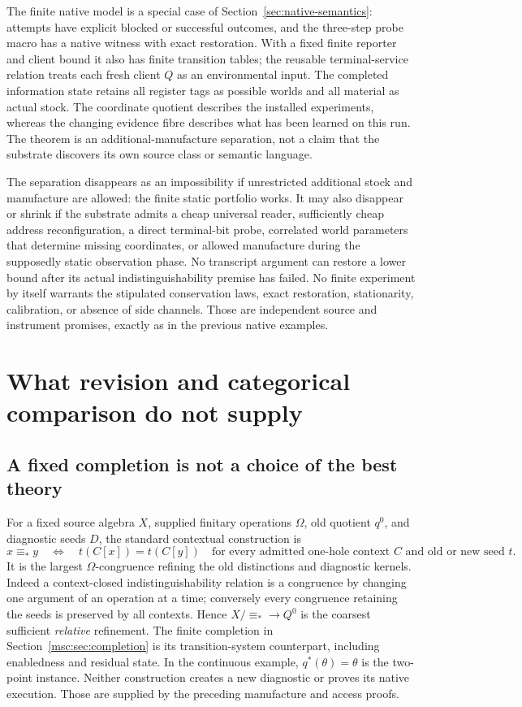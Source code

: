 \documentclass[11pt]{article}
\theoremstyle{definition}
\theoremstyle{remark}
\begin{document}
The finite native model is a special case of Section~\ref{sec:native-semantics}:
attempts have explicit blocked or successful outcomes, and the three-step
probe macro has a native witness with exact restoration. With a fixed
finite reporter and client bound it also has finite transition tables;
the reusable terminal-service relation treats each fresh client $Q$ as
an environmental input. The completed information state retains all
register tags as possible worlds and all material as actual stock.
The coordinate quotient describes the installed experiments, whereas
the changing evidence fibre describes what has been learned on this run.
The theorem is an additional-manufacture separation, not a claim that
the substrate discovers its own source class or semantic language.

The separation disappears as an impossibility if unrestricted additional
stock and manufacture are allowed: the finite static portfolio works.
It may also disappear or shrink if the substrate admits a cheap universal
reader, sufficiently cheap address reconfiguration, a direct terminal-bit
probe, correlated world parameters that determine missing coordinates,
or allowed manufacture during the supposedly static observation phase.
No transcript argument can restore a lower bound after its actual
indistinguishability premise has failed. No finite experiment by itself
warrants the stipulated conservation laws, exact restoration, stationarity,
calibration, or absence of side channels. Those are independent source
and instrument promises, exactly as in the previous native examples.


\section{What revision and categorical comparison do not supply}
\label{sec:revision-limits}
\subsection{A fixed completion is not a choice of the best theory}
For a fixed source algebra $X$, supplied finitary operations $\Omega$,
old quotient $q^0$, and diagnostic seeds $D$, the standard contextual
construction is
\[
 x\equiv_*y\quad\Longleftrightarrow\quad
 t(C[x])=t(C[y])
 \quad\text{for every admitted one-hole context }C
 \text{ and old or new seed }t.
\]
It is the largest $\Omega$-congruence refining the old distinctions and
diagnostic kernels. Indeed a context-closed indistinguishability relation
is a congruence by changing one argument of an operation at a time;
conversely every congruence retaining the seeds is preserved by all
contexts. Hence $X/{\equiv_*}\to Q^0$ is the coarsest sufficient
\emph{relative} refinement. The finite completion in
Section~\ref{msc:sec:completion} is its transition-system counterpart,
including enabledness and residual state. In the continuous example,
$q^*(\theta)=\theta$ is the two-point instance. Neither construction
creates a new diagnostic or proves its native execution. Those are
supplied by the preceding manufacture and access proofs.
\end{document}

